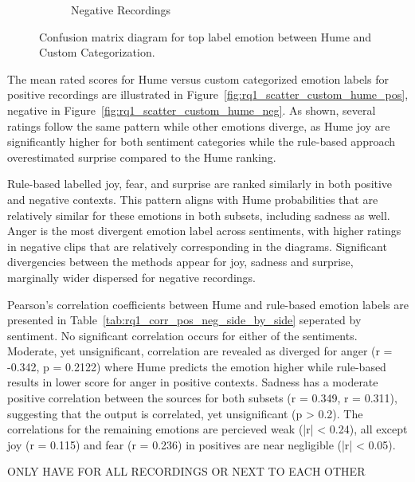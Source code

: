 \begin{figure}[H]
\begin{subfigure}[b]{0.45\textwidth}
        \caption{Negative Recordings}
        \label{fig:rq1_conf_neg}
    \end{subfigure}
    \caption{Confusion matrix diagram for top label emotion between Hume and Custom Categorization.}
    \label{fig:rq1_conf_matx_full}
\end{figure}

The mean rated scores for Hume versus custom categorized emotion labels for positive recordings are illustrated in 
Figure~\ref{fig:rq1_scatter_custom_hume_pos}, negative in Figure~\ref{fig:rq1_scatter_custom_hume_neg}. As shown, several ratings follow the same 
pattern while other emotions diverge, as Hume joy are significantly higher for both sentiment categories while the rule-based approach overestimated surprise compared to the Hume ranking. 


Rule-based labelled joy, fear, and surprise are ranked similarly in both positive and negative contexts. This pattern aligns with Hume probabilities that are relatively similar for these emotions in both subsets, including sadness as well. 
Anger is the most divergent emotion label across sentiments, with higher ratings in negative clips that are relatively corresponding in the diagrams. Significant divergencies between the methods appear for joy, sadness and surprise, marginally wider dispersed for negative recordings. 


Pearson's correlation coefficients between Hume and rule-based emotion labels are presented in Table~\ref{tab:rq1_corr_pos_neg_side_by_side} seperated by sentiment. 
No significant correlation occurs for either of the sentiments. Moderate, yet unsignificant, correlation are revealed as diverged for anger (r = -0.342, p = 0.2122) where Hume predicts the emotion 
higher while rule-based results in lower score for anger in positive contexts. Sadness has a moderate positive correlation between the sources for both subsets (r = 0.349, r = 0.311), suggesting that the output is correlated, yet unsignificant (p > 0.2). 
The correlations for the remaining emotions are percieved weak (|r| < 0.24), all except joy (r = 0.115) and fear (r = 0.236) in positives are near negligible (|r| < 0.05).  


ONLY HAVE FOR ALL RECORDINGS OR NEXT TO EACH OTHER

